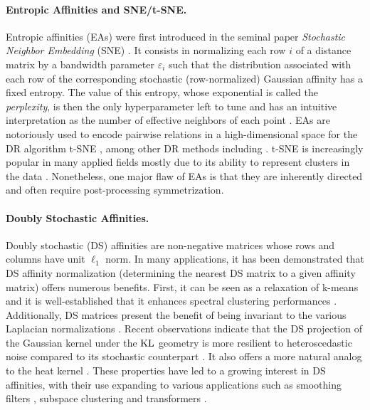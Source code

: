 \paragraph{Entropic Affinities and SNE/t-SNE.}
Entropic affinities (EAs) were first introduced in the
seminal paper \emph{Stochastic Neighbor Embedding} (SNE) 
\cite{hinton2002stochastic}. It consists in normalizing each row $i$ of a distance matrix by a
bandwidth parameter $\varepsilon_i$ such that the distribution associated with each row of the corresponding stochastic (\ie row-normalized) Gaussian affinity has a fixed entropy. The value of this entropy, whose exponential is called
the \emph{perplexity}, is then the only hyperparameter left to tune and has
an intuitive interpretation as the number of effective neighbors of each point \cite{vladymyrov2013entropic}.
EAs are notoriously used to encode pairwise relations in a high-dimensional space for the DR algorithm t-SNE \cite{van2008visualizing}, among other DR methods including \cite{carreira2010elastic}. t-SNE is increasingly popular in many applied fields \cite{kobak2019art,
melit2020unsupervised} mostly due to its ability to represent clusters in the data \cite{linderman2019clustering, JMLR:v23:21-0524}. Nonetheless, one major flaw of EAs is that they are inherently directed and often require post-processing symmetrization.

\paragraph{Doubly Stochastic Affinities.}
Doubly stochastic (DS) affinities are non-negative matrices whose rows and columns have unit $\ell_1$ norm. 
In many applications, it has been demonstrated that DS affinity normalization (\ie determining the nearest DS matrix to a given affinity matrix) offers numerous benefits. First, it can be seen as a relaxation of k-means \cite{zass2005unifying} and it is well-established that it enhances spectral clustering performances \cite{Ding_understand,Zass,beauchemin2015affinity}. Additionally, DS matrices present the benefit of being invariant to the various Laplacian normalizations \cite{von2007tutorial}. Recent observations indicate that the DS projection of the Gaussian kernel under the $\operatorname{KL}$ geometry is more resilient to heteroscedastic noise compared to its stochastic counterpart \cite{landa2021doubly}. It also offers a more natural analog to the heat kernel \cite{marshall2019manifold}.
These properties have led to a growing interest in DS affinities, with their use expanding to various applications such as smoothing filters \cite{Milanfar}, subspace clustering \cite{lim2020doubly} and transformers \cite{sander2022sinkformers}.

